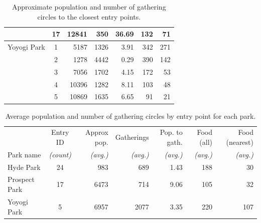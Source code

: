 \begin{table}[H]
\begin{tabular}{lcrrrrr}
{} &        17 &       12841 &       350 &     36.69 &       132 &            71 \\
\midrule
Yoyogi Park &         1 &        5187 &      1326 &      3.91 &       342 &           271 \\
{} &         2 &        1278 &      4442 &      0.29 &       390 &           142 \\
{} &         3 &        7056 &      1702 &      4.15 &       172 &            53 \\
{} &         4 &       10396 &      1282 &      8.11 &       103 &            48 \\
{} &         5 &       10869 &      1635 &      6.65 &        91 &            21 \\
\bottomrule
\end{tabular}
\caption[Approximate population to gatherings]{Approximate population and number of gathering circles to the closest entry points.}
\label{table:all_pop_gath}
\end{table}

\begin{table}[H]
\centering
\small
\begin{tabular}{lcrrrrr}
\toprule
{}     & Entry ID &  Approx pop. &  Gatherings &  Pop. to gath. &  Food (all) &  Food (nearest) \\
Park name &  \textit{(count)} &  \textit{(avg.)} &  \textit{(avg.)} &  \textit{(avg.)} &  \textit{(avg.)} &  \textit{(avg.)} \\
\midrule
Hyde Park     &        24 &         983 &       689 &      1.43 &       188 &            30 \\
Prospect Park &        17 &        6473 &       714 &      9.06 &       105 &            32 \\
Yoyogi Park   &         5 &        6957 &      2077 &      3.35 &       220 &           107 \\
\bottomrule
\end{tabular}
\caption[Entry point averages]{Average population and number of gathering circles by entry point for each park.}
\label{table:avg_pop_gath}
\end{table}

